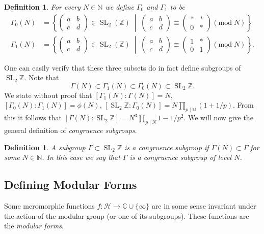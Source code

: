 \documentclass[titlepage,a4paper]{article}
\theoremstyle{theoremdd}
\theoremstyle{definitiondd}
\newtheorem{definition}[theorem]{Definition}
\theoremstyle{remarkdd}
\newcommand{\N}{\mathbb{N}}
\newcommand{\Z}{\mathbb{Z}}
\newcommand{\C}{\mathbb{C}}
\newcommand{\bigset}[2]{ \left\{ #1 \;\middle|\; #2 \right\} }
\DeclareMathOperator{\SL}{SL}
\begin{document}
\begin{definition}
	For every $N \in \N$ we define $\Gamma_0$ and $\Gamma_1$ to be 
	\begin{align*}
		\Gamma_0(N) &= \bigset{\begin{pmatrix} a & b \\ c & d \end{pmatrix} \in \SL_2(\Z)}{\begin{pmatrix} a & b \\ c & d \end{pmatrix}  \equiv \begin{pmatrix} * & * \\ 0 & * \end{pmatrix}  (\mathrm{mod}\; N)} \\
		\Gamma_1(N) &= \bigset{\begin{pmatrix} a & b \\ c & d \end{pmatrix} \in \SL_2(\Z)}{\begin{pmatrix} a & b \\ c & d \end{pmatrix}  \equiv \begin{pmatrix} 1 & * \\ 0 & 1 \end{pmatrix}  (\mathrm{mod}\; N)}
	.\end{align*}
\end{definition} 
One can easily verify that these three subsets do in fact define subgroups of $\SL_2\Z$. 
Note that 
\[
	\Gamma(N) \subset \Gamma_1(N) \subset \Gamma_0(N) \subset  \SL_2\Z
.\] 
We state without proof that $[\Gamma_1(N): \Gamma(N)] = N$, $[\Gamma_0 (N): \Gamma_1(N)]= \phi(N)$, $[\SL_2\Z: \Gamma_0(N)] = N \prod_{p \mathbin | \N}(1 + 1 /p)$. 
From this it follows that $[\Gamma(N): \SL_2\Z]= N^3 \prod_{p \mathbin | N} 1 - 1 /p^2$.
We will now give the general definition of \emph{congruence subgroups}. 
 \begin{definition}
	 A subgroup $\Gamma \subset \SL_2\Z$ is a \emph{congruence subgroup} if $\Gamma(N) \subset \Gamma$ for some $N \in \N$. In this case we say that $\Gamma$ is a congruence subgroup of level $N$. 
\end{definition}
\subsection{Defining Modular Forms}\label{sec:defining_modular_forms}

Some meromorphic functions $f:\mathcal{H}  \to \C \cup \{\infty\} $ are in some sense invariant under the action of the modular group (or one of its subgroups). 
These functions are the \emph{modular forms}.
\end{document}
